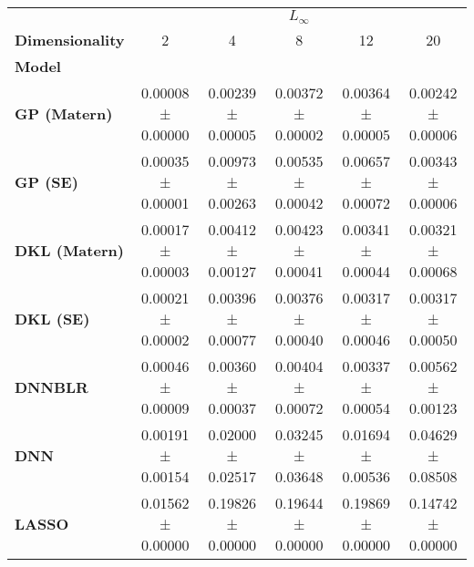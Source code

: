 \begin{tabular}{lccccc}
\toprule
{} & \multicolumn{5}{c}{$L_\infty$} \\
\textbf{Dimensionality} &                 2  &                 4  &                 8  &                 12 &                 20 \\
\textbf{Model       } &                    &                    &                    &                    &                    \\
\midrule
\textbf{GP (Matern) } &  0.00008 ± 0.00000 &  0.00239 ± 0.00005 &  0.00372 ± 0.00002 &  0.00364 ± 0.00005 &  0.00242 ± 0.00006 \\
\textbf{GP (SE)     } &  0.00035 ± 0.00001 &  0.00973 ± 0.00263 &  0.00535 ± 0.00042 &  0.00657 ± 0.00072 &  0.00343 ± 0.00006 \\
\textbf{DKL (Matern)} &  0.00017 ± 0.00003 &  0.00412 ± 0.00127 &  0.00423 ± 0.00041 &  0.00341 ± 0.00044 &  0.00321 ± 0.00068 \\
\textbf{DKL (SE)    } &  0.00021 ± 0.00002 &  0.00396 ± 0.00077 &  0.00376 ± 0.00040 &  0.00317 ± 0.00046 &  0.00317 ± 0.00050 \\
\textbf{DNNBLR      } &  0.00046 ± 0.00009 &  0.00360 ± 0.00037 &  0.00404 ± 0.00072 &  0.00337 ± 0.00054 &  0.00562 ± 0.00123 \\
\textbf{DNN         } &  0.00191 ± 0.00154 &  0.02000 ± 0.02517 &  0.03245 ± 0.03648 &  0.01694 ± 0.00536 &  0.04629 ± 0.08508 \\
\textbf{LASSO       } &  0.01562 ± 0.00000 &  0.19826 ± 0.00000 &  0.19644 ± 0.00000 &  0.19869 ± 0.00000 &  0.14742 ± 0.00000 \\
\bottomrule
\end{tabular}
